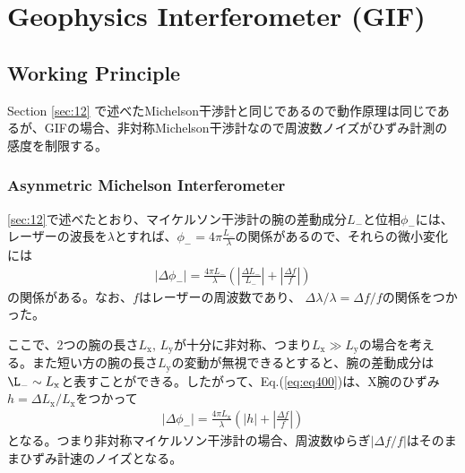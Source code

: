 \chapter{Geophysics Interferometer (GIF)}

\section{Working Principle}
Section \cref{sec:12} で述べたMichelson干渉計と同じであるので動作原理は同じであるが、GIFの場合、非対称Michelson干渉計なので周波数ノイズがひずみ計測の感度を制限する。

\subsection{Asynmetric Michelson Interferometer}
\cref{sec:12}で述べたとおり、マイケルソン干渉計の腕の差動成分${L_{-}}$と位相${\phi_{-}}$には、レーザーの波長を$\lambda$とすれば、${\phi}_{-} = 4\pi\frac{{L_{-}}}{\lambda}$の関係があるので、それらの微小変化には
\begin{eqnarray}  
  \left|\Delta \phi_{-}\right| = \frac{4\pi{L_{-}}}{\lambda}\left( \left|\frac{\Delta L_{-}}{L_{-}}\right| + \left|\frac{\Delta f}{f}\right|\right) \label{eq:eq400}
\end{eqnarray}
の関係がある。なお、$f$はレーザーの周波数であり、 $\Delta{\lambda}/\lambda = \Delta{f}/f$の関係をつかった。

ここで、2つの腕の長さ$L_{\mathrm{x}},\,L_{\mathrm{y}}$が十分に非対称、つまり$L_{\mathrm{x}} \gg L_{\mathrm{y}}$の場合を考える。また短い方の腕の長さ$L_{\mathrm{y}}$の変動が無視できるとすると、腕の差動成分は$\L_{-}\sim{L_{\mathrm{x}}}$と表すことができる。したがって、Eq.(\ref{eq:eq400})は、X腕のひずみ$h=\Delta{L_{\mathrm{x}}}/L_{\mathrm{x}}$をつかって
\begin{eqnarray}  
  \left|\Delta \phi_{-}\right| = \frac{4\pi{L_{\mathrm{x}}}}{\lambda}\left( \left|h\right|  + \left|\frac{\Delta f}{f}\right|\right) \label{eq:eq400_a}
\end{eqnarray}
となる。つまり非対称マイケルソン干渉計の場合、周波数ゆらぎ$|\Delta{f}/f|$はそのままひずみ計速のノイズとなる。

